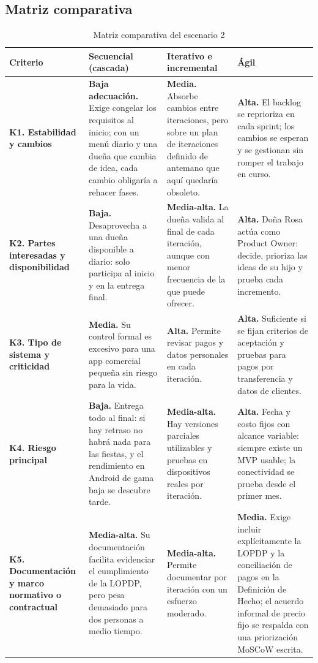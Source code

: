 \documentclass[12pt,a4paper]{article}
\begin{document}
\subsection{Matriz comparativa}

\begin{table}[H]
\centering
\caption{Matriz comparativa del escenario 2}
\small
\begin{tabularx}{\textwidth}{
    >{\raggedright\arraybackslash}p{2.4cm} Y Y Y
}
\toprule
\textbf{Criterio} &
\textbf{Secuencial (cascada)} &
\textbf{Iterativo e incremental} &
\textbf{Ágil} \\
\midrule

\textbf{K1. Estabilidad y cambios} & \textbf{Baja adecuación.} Exige congelar los requisitos al inicio; con un menú diario y una dueña que cambia de idea, cada cambio obligaría a rehacer fases. & \textbf{Media.} Absorbe cambios entre iteraciones, pero sobre un plan de iteraciones definido de antemano que aquí quedaría obsoleto. & \textbf{Alta.} El backlog se reprioriza en cada sprint; los cambios se esperan y se gestionan sin romper el trabajo en curso. \\
\midrule
\textbf{K2. Partes interesadas y disponibilidad} & \textbf{Baja.} Desaprovecha a una dueña disponible a diario: solo participa al inicio y en la entrega final. & \textbf{Media-alta.} La dueña valida al final de cada iteración, aunque con menor frecuencia de la que puede ofrecer. & \textbf{Alta.} Doña Rosa actúa como Product Owner: decide, prioriza las ideas de su hijo y prueba cada incremento. \\
\midrule
\textbf{K3. Tipo de sistema y criticidad} & \textbf{Media.} Su control formal es excesivo para una app comercial pequeña sin riesgo para la vida. & \textbf{Alta.} Permite revisar pagos y datos personales en cada iteración. & \textbf{Alta.} Suficiente si se fijan criterios de aceptación y pruebas para pagos por transferencia y datos de clientes. \\
\midrule
\textbf{K4. Riesgo principal} & \textbf{Baja.} Entrega todo al final: si hay retraso no habrá nada para las fiestas, y el rendimiento en Android de gama baja se descubre tarde. & \textbf{Media-alta.} Hay versiones parciales utilizables y pruebas en dispositivos reales por iteración. & \textbf{Alta.} Fecha y costo fijos con alcance variable: siempre existe un MVP usable; la conectividad se prueba desde el primer mes. \\
\midrule
\textbf{K5. Documentación y marco normativo o contractual} & \textbf{Media-alta.} Su documentación facilita evidenciar el cumplimiento de la LOPDP, pero pesa demasiado para dos personas a medio tiempo. & \textbf{Media-alta.} Permite documentar por iteración con un esfuerzo moderado. & \textbf{Media.} Exige incluir explícitamente la LOPDP y la conciliación de pagos en la Definición de Hecho; el acuerdo informal de precio fijo se respalda con una priorización MoSCoW escrita. \\
\bottomrule
\end{tabularx}
\end{table}
\end{document}
